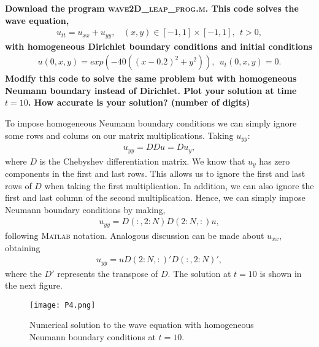 \textbf{Download the program \textsc{wave2D\_leap\_frog.m}. This code solves the wave equation,
\begin{align*}
u_{tt}=u_{xx}+u_{yy},~~~~(x,y)\in [-1,1]\times [-1,1],~~t>0,
\end{align*}
with homogeneous Dirichlet boundary conditions and initial conditions
\begin{align*}
u(0,x,y) = exp(-40((x−0.2)^2+y^2)),~~ u_t(0, x, y) = 0.
\end{align*}
Modify this code to solve the same problem but with homogeneous Neumann boundary instead of Dirichlet. Plot your solution at time $t= 10$. How accurate is your solution? (number of digits)
}
\newline

To impose homogeneous Neumann boundary conditions we can simply ignore some rows and colums on our matrix multiplications. Taking $u_{yy}$:
\begin{align*}
u_{yy} = DDu = Du_y,
\end{align*}
where $D$ is the Chebyshev differentiation matrix. We know that $u_y$ has zero components in the first and last rows. This allows us to ignore the first and last rows of $D$ when taking the first multiplication. In addition, we can also ignore the first and last column of the second multiplication. Hence, we can simply impose Neumann boundary conditions by making,
\begin{align*}
u_{yy} = D(:,2:N)D(2:N,:)u,
\end{align*}
following \textsc{Matlab} notation. Analogous discussion can be made about $u_{xx}$, obtaining
\begin{align*}
u_{yy} = uD(2:N,:)'D(:,2:N)',
\end{align*}
where the $D'$ represents the transpose of $D$. The solution at $t=10$ is shown in the next figure.

\begin{figure}[H]
\centering
\texttt{[image: P4.png]}\caption{Numerical solution to the wave equation with homogeneous Neumann boundary conditions at $t=10$.}
\end{figure}

